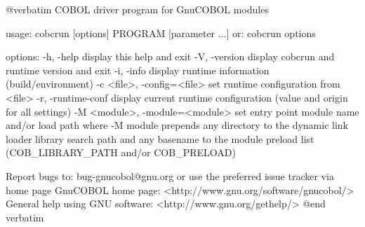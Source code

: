 @verbatim
COBOL driver program for GnuCOBOL modules

usage: cobcrun [options] PROGRAM [parameter ...]
  or: cobcrun options

options:
  -h, -help                      display this help and exit
  -V, -version                   display cobcrun and runtime version and exit
  -i, -info                      display runtime information (build/environment)
  -c <file>, -config=<file>      set runtime configuration from <file>
  -r, -runtime-conf              display current runtime configuration
                                 (value and origin for all settings)
  -M <module>, -module=<module>  set entry point module name and/or load path
                                 where -M module prepends any directory to the
                                 dynamic link loader library search path
                                 and any basename to the module preload list
                                 (COB_LIBRARY_PATH and/or COB_PRELOAD)

Report bugs to: bug-gnucobol@gnu.org or
use the preferred issue tracker via home page
GnuCOBOL home page: <http://www.gnu.org/software/gnucobol/>
General help using GNU software: <http://www.gnu.org/gethelp/>
@end verbatim

